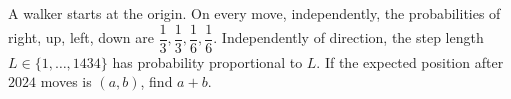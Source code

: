 A walker starts at the origin. On every move, independently, the probabilities of right, up, left, down are $\dfrac{1}{3},\dfrac{1}{3},\dfrac{1}{6},\dfrac{1}{6}$. Independently of direction, the step length $L\in\{1,\ldots,1434\}$ has probability proportional to $L$. If the expected position after $2024$ moves is $(a,b)$, find $a+b$.
